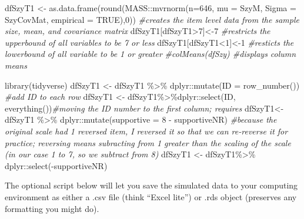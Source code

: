 \documentclass[
  english,
]{book}
\newenvironment{Shaded}{\begin{snugshade}}{\end{snugshade}}
\newcommand{\AttributeTok}[1]{\textcolor[rgb]{0.77,0.63,0.00}{#1}}
\newcommand{\CommentTok}[1]{\textcolor[rgb]{0.56,0.35,0.01}{\textit{#1}}}
\newcommand{\ConstantTok}[1]{\textcolor[rgb]{0.00,0.00,0.00}{#1}}
\newcommand{\DecValTok}[1]{\textcolor[rgb]{0.00,0.00,0.81}{#1}}
\newcommand{\FunctionTok}[1]{\textcolor[rgb]{0.00,0.00,0.00}{#1}}
\newcommand{\NormalTok}[1]{#1}
\newcommand{\OtherTok}[1]{\textcolor[rgb]{0.56,0.35,0.01}{#1}}
\newcommand{\SpecialCharTok}[1]{\textcolor[rgb]{0.00,0.00,0.00}{#1}}
\begin{document}
\begin{Shaded}
\begin{Highlighting}[]
\NormalTok{dfSzyT1 }\OtherTok{\textless{}{-}} \FunctionTok{as.data.frame}\NormalTok{(}\FunctionTok{round}\NormalTok{(MASS}\SpecialCharTok{::}\FunctionTok{mvrnorm}\NormalTok{(}\AttributeTok{n=}\DecValTok{646}\NormalTok{, }\AttributeTok{mu =}\NormalTok{ SzyM, }\AttributeTok{Sigma =}\NormalTok{ SzyCovMat, }\AttributeTok{empirical =} \ConstantTok{TRUE}\NormalTok{),}\DecValTok{0}\NormalTok{)) }\CommentTok{\#creates the item level data from the sample size, mean, and covariance matrix}
\NormalTok{dfSzyT1[dfSzyT1}\SpecialCharTok{\textgreater{}}\DecValTok{7}\NormalTok{]}\OtherTok{\textless{}{-}}\DecValTok{7} \CommentTok{\#restricts the upperbound of all variables to be 7 or less}
\NormalTok{dfSzyT1[dfSzyT1}\SpecialCharTok{\textless{}}\DecValTok{1}\NormalTok{]}\OtherTok{\textless{}{-}}\DecValTok{1} \CommentTok{\#resticts the lowerbound of all variable to be 1 or greater}
\CommentTok{\#colMeans(dfSzy) \#displays column means}

\FunctionTok{library}\NormalTok{(tidyverse)}
\NormalTok{dfSzyT1 }\OtherTok{\textless{}{-}}\NormalTok{ dfSzyT1 }\SpecialCharTok{\%\textgreater{}\%}\NormalTok{ dplyr}\SpecialCharTok{::}\FunctionTok{mutate}\NormalTok{(}\AttributeTok{ID =} \FunctionTok{row\_number}\NormalTok{()) }\CommentTok{\#add ID to each row}
\NormalTok{dfSzyT1 }\OtherTok{\textless{}{-}}\NormalTok{ dfSzyT1}\SpecialCharTok{\%\textgreater{}\%}\NormalTok{dplyr}\SpecialCharTok{::}\FunctionTok{select}\NormalTok{(ID, }\FunctionTok{everything}\NormalTok{())}\CommentTok{\#moving the ID number to the first column; requires}
\NormalTok{dfSzyT1}\OtherTok{\textless{}{-}}\NormalTok{ dfSzyT1 }\SpecialCharTok{\%\textgreater{}\%}
\NormalTok{  dplyr}\SpecialCharTok{::}\FunctionTok{mutate}\NormalTok{(}\AttributeTok{supportive =} \DecValTok{8} \SpecialCharTok{{-}}\NormalTok{ supportiveNR) }\CommentTok{\#because the original scale had 1 reversed item, I reversed it so that we can re{-}reverse it for practice; reversing means subracting from 1 greater than the scaling of the scale (in our case 1 to 7, so we subtract from 8)}
\NormalTok{dfSzyT1 }\OtherTok{\textless{}{-}}\NormalTok{ dfSzyT1}\SpecialCharTok{\%\textgreater{}\%}
\NormalTok{  dplyr}\SpecialCharTok{::}\FunctionTok{select}\NormalTok{(}\SpecialCharTok{{-}}\NormalTok{supportiveNR)}
\end{Highlighting}
\end{Shaded}

The optional script below will let you save the simulated data to your computing environment as either a .csv file (think ``Excel lite'') or .rds object (preserves any formatting you might do).
\end{document}
